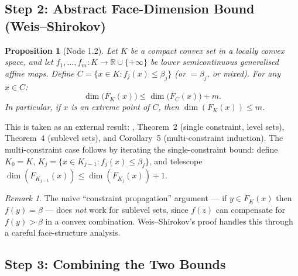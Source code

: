 \documentclass[11pt,a4paper]{article}
\theoremstyle{plain}
\newtheorem{proposition}[theorem]{Proposition}
\theoremstyle{definition}
\theoremstyle{remark}
\newtheorem{remark}[theorem]{Remark}
\newcommand{\R}{\mathbb{R}}
\begin{document}
\subsection{Step 2: Abstract Face-Dimension Bound (Weis--Shirokov)}
\label{sec:weis-shirokov}

\begin{proposition}[Node 1.2]
\label{prop:weis-shirokov}
Let $K$ be a compact convex set in a locally convex space, and let
$f_1, \ldots, f_m : K \to \R \cup \{+\infty\}$ be lower semicontinuous
generalised affine maps. Define $C = \{x \in K : f_j(x) \le \beta_j\}$
(or $= \beta_j$, or mixed). For any $x \in C$:
\begin{equation}
\label{eq:ws-bound}
  \dim\bigl(F_K(x)\bigr) \le \dim\bigl(F_C(x)\bigr) + m.
\end{equation}
In particular, if $x$ is an extreme point of $C$, then
$\dim(F_K(x)) \le m$.
\end{proposition}

This is taken as an external result: \cite{weisshirokov2021}, Theorem~2
(single constraint, level sets), Theorem~4 (sublevel sets), and
Corollary~5 (multi-constraint induction). The multi-constraint case
follows by iterating the single-constraint bound: define
$K_0 = K$, $K_j = \{x \in K_{j-1} : f_j(x) \le \beta_j\}$,
and telescope $\dim(F_{K_{j-1}}(x)) \le \dim(F_{K_j}(x)) + 1$.

\begin{remark}
The naive ``constraint propagation'' argument --- if $y \in F_K(x)$ then
$f(y) = \beta$ --- does \emph{not} work for sublevel sets, since $f(z)$
can compensate for $f(y) > \beta$ in a convex combination.
Weis--Shirokov's proof handles this through a careful face-structure
analysis.
\end{remark}

\subsection{Step 3: Combining the Two Bounds}
\label{sec:combining}
\end{document}
